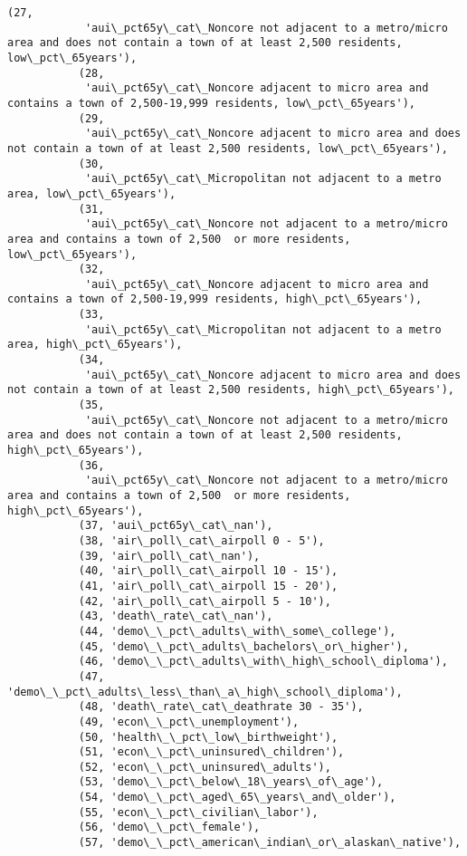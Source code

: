 \documentclass[11pt]{article}
\begin{document}
\begin{Verbatim}[commandchars=\\\{\}]
           (27,
            'aui\_pct65y\_cat\_Noncore not adjacent to a metro/micro area and does not contain a town of at least 2,500 residents, low\_pct\_65years'),
           (28,
            'aui\_pct65y\_cat\_Noncore adjacent to micro area and contains a town of 2,500-19,999 residents, low\_pct\_65years'),
           (29,
            'aui\_pct65y\_cat\_Noncore adjacent to micro area and does not contain a town of at least 2,500 residents, low\_pct\_65years'),
           (30,
            'aui\_pct65y\_cat\_Micropolitan not adjacent to a metro area, low\_pct\_65years'),
           (31,
            'aui\_pct65y\_cat\_Noncore not adjacent to a metro/micro area and contains a town of 2,500  or more residents, low\_pct\_65years'),
           (32,
            'aui\_pct65y\_cat\_Noncore adjacent to micro area and contains a town of 2,500-19,999 residents, high\_pct\_65years'),
           (33,
            'aui\_pct65y\_cat\_Micropolitan not adjacent to a metro area, high\_pct\_65years'),
           (34,
            'aui\_pct65y\_cat\_Noncore adjacent to micro area and does not contain a town of at least 2,500 residents, high\_pct\_65years'),
           (35,
            'aui\_pct65y\_cat\_Noncore not adjacent to a metro/micro area and does not contain a town of at least 2,500 residents, high\_pct\_65years'),
           (36,
            'aui\_pct65y\_cat\_Noncore not adjacent to a metro/micro area and contains a town of 2,500  or more residents, high\_pct\_65years'),
           (37, 'aui\_pct65y\_cat\_nan'),
           (38, 'air\_poll\_cat\_airpoll 0 - 5'),
           (39, 'air\_poll\_cat\_nan'),
           (40, 'air\_poll\_cat\_airpoll 10 - 15'),
           (41, 'air\_poll\_cat\_airpoll 15 - 20'),
           (42, 'air\_poll\_cat\_airpoll 5 - 10'),
           (43, 'death\_rate\_cat\_nan'),
           (44, 'demo\_\_pct\_adults\_with\_some\_college'),
           (45, 'demo\_\_pct\_adults\_bachelors\_or\_higher'),
           (46, 'demo\_\_pct\_adults\_with\_high\_school\_diploma'),
           (47, 'demo\_\_pct\_adults\_less\_than\_a\_high\_school\_diploma'),
           (48, 'death\_rate\_cat\_deathrate 30 - 35'),
           (49, 'econ\_\_pct\_unemployment'),
           (50, 'health\_\_pct\_low\_birthweight'),
           (51, 'econ\_\_pct\_uninsured\_children'),
           (52, 'econ\_\_pct\_uninsured\_adults'),
           (53, 'demo\_\_pct\_below\_18\_years\_of\_age'),
           (54, 'demo\_\_pct\_aged\_65\_years\_and\_older'),
           (55, 'econ\_\_pct\_civilian\_labor'),
           (56, 'demo\_\_pct\_female'),
           (57, 'demo\_\_pct\_american\_indian\_or\_alaskan\_native'),

\end{Verbatim}
\end{document}
